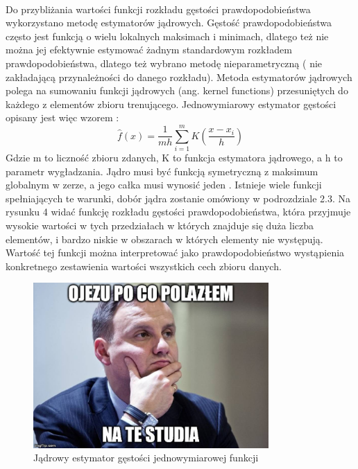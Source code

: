 \documentclass[a4paper,12pt,twoside]{article}
\begin{document}
\paragraph{}
Do przybliżania wartości funkcji rozkładu gęstości prawdopodobieństwa wykorzystano metodę estymatorów jądrowych. Gęstość prawdopodobieństwa często jest funkcją o wielu lokalnych maksimach i minimach, dlatego też nie można jej efektywnie estymować  żadnym standardowym rozkładem prawdopodobieństwa, dlatego też wybrano metodę nieparametryczną ( nie zakładającą przynależności do danego rozkładu). Metoda estymatorów jądrowych polega na sumowaniu funkcji jądrowych (ang. kernel functions) przesuniętych do każdego z elementów zbioru trenującego. Jednowymiarowy estymator gęstości opisany jest więc wzorem \cite{kde}:
\begin{equation} \hat{f}(x)=\frac{1}{mh}\sum_{i=1}^{m}K\left ( \frac{x-x_{i}}{h} \right )
\end{equation}
Gdzie m to liczność zbioru zdanych, K to funkcja estymatora jądrowego, a h to parametr wygładzania. Jądro musi być funkcją symetryczną z maksimum globalnym w zerze, a jego całka musi wynosić jeden \cite{kde2}. Istnieje wiele funkcji spełniających te warunki, dobór jądra zostanie omówiony w podrozdziale 2.3. Na rysunku 4 widać  funkcję rozkładu gęstości prawdopodobieństwa, która przyjmuje wysokie wartości w tych przedziałach w których znajduje się duża liczba elementów, i bardzo niskie w obszarach w których elementy nie występują. Wartość tej funkcji można interpretować jako prawdopodobieństwo wystąpienia konkretnego zestawienia wartości wszystkich cech zbioru danych.
\begin{figure}[h]
    \centering
    \includegraphics[width=0.8\textwidth]{dudel.jpg}
    \caption{Jądrowy estymator gęstości jednowymiarowej funkcji}
\end{figure}
\end{document}
